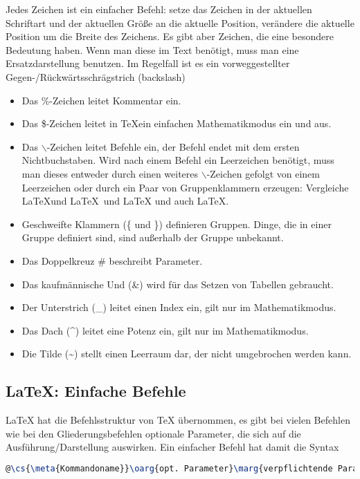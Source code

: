 \documentclass[ngerman,               %
               a4paper,               %
               fleqn,                 %
                     ]{scrreprt}
\begin{document}
Jedes Zeichen ist ein einfacher Befehl: setze das Zeichen in der
aktuellen Schriftart und der aktuellen Größe an die aktuelle
Position, verändere die aktuelle Position um die Breite des Zeichens.
Es gibt aber Zeichen, die eine besondere Bedeutung haben. Wenn man
diese im Text benötigt, muss man eine Ersatzdarstellung benutzen. Im
Regelfall ist es ein vorweggestellter Gegen-/Rückwärtsschrägstrich
(backslash)
\begin{itemize} %
  \item Das \%-Zeichen leitet Kommentar ein.
  \item Das \$-Zeichen leitet in \TeX ein einfachen Mathematikmodus ein
  und aus.
  \item Das \(\backslash\)-Zeichen leitet Befehle ein, der Befehl endet
   mit dem ersten Nichtbuchstaben. Wird nach einem Befehl ein Leerzeichen benötigt, muss man dieses entweder durch einen weiteres
   \(\backslash\)-Zeichen gefolgt von einem Leerzeichen oder durch ein
   Paar von Gruppenklammern erzeugen: Vergleiche \LaTeX und \LaTeX\
   und \LaTeX{} und auch \LaTeX.
  \item Geschweifte Klammern (\{ und \}) definieren Gruppen. Dinge, die
   in einer Gruppe definiert sind, sind außerhalb der Gruppe unbekannt.
  \item Das Doppelkreuz \# beschreibt Parameter.
  \item Das kaufmännische Und (\&) wird für das Setzen von Tabellen
  gebraucht.
  \item Der Unterstrich (\_) leitet einen Index ein, gilt nur im
   Mathematikmodus.
  \item Das Dach (\^{}) leitet eine Potenz ein, gilt nur im
  Mathematikmodus.
  \item Die Tilde (\~{}) stellt einen Leerraum dar, der nicht umgebrochen werden kann.
\end{itemize}

  \subsection{\LaTeX: Einfache Befehle}

  \LaTeX{} hat die Befehlsstruktur von \TeX{} übernommen, es gibt bei
   vielen Befehlen wie bei den Gliederungsbefehlen optionale Parameter,
   die sich auf die Ausführung/Darstellung auswirken. Ein einfacher
    Befehl hat damit die Syntax
\begin{lstlisting}[language=tex, style=colored]
@\cs{\meta{Kommandoname}}\oarg{opt. Parameter}\marg{verpflichtende Parameter}@
\end{lstlisting}
\end{document}
